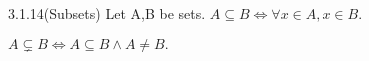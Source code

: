 \documentclass{article}
\begin{document}
\begin{defbox}{3.1.14}{(Subsets)}
  Let A,B be sets. \(A \subseteq B \iff \forall x \in A, x \in B.\)

  \(A \subsetneq B \iff A \subseteq B \land A \neq B.\)
\end{defbox}
\end{document}
